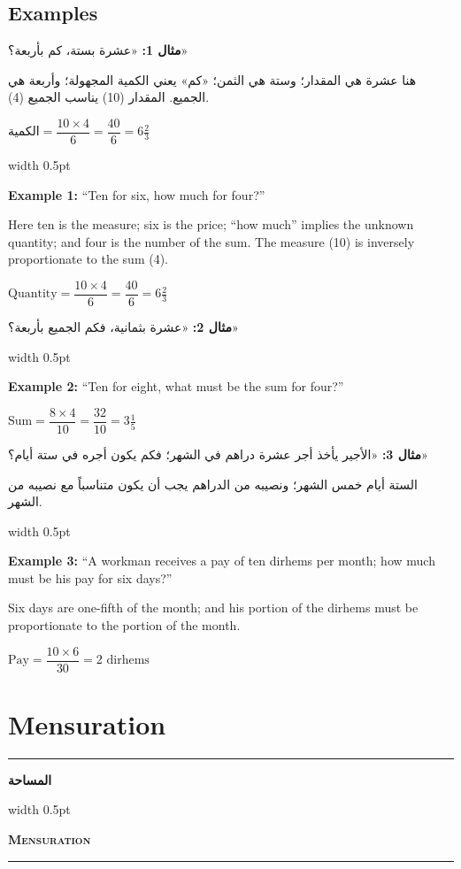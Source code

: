 \documentclass[10pt,a4paper]{book}
\newlength{\colwidth}
\newcommand{\bilingualpair}[2]{%
  \noindent
  \begin{minipage}[t]{\colwidth}
  \begin{flushright}
  \vspace{0pt}
  {\arabicfont\small #1}
  \end{flushright}
  \end{minipage}%
  \hfill\textcolor{columnsepclr}{\vrule width 0.5pt}\hfill
  \begin{minipage}[t]{\colwidth}
  \vspace{0pt}
  {\small #2}
  \end{minipage}%
  \par\vspace{0.6em}
}
\newcommand{\bilingualsectionheader}[2]{%
  \par\vspace{0.8em}
  \noindent
  \begin{minipage}[t]{\colwidth}
  \begin{flushright}
  \textbf{\arabicfont #1}
  \end{flushright}
  \end{minipage}%
  \hfill\textcolor{columnsepclr}{\vrule width 0.5pt}\hfill
  \begin{minipage}[t]{\colwidth}
  \textbf{\textsc{#2}}
  \end{minipage}%
  \par\vspace{0.5em}
}
\begin{document}
\section*{Examples}

\bilingualpair{
\textbf{مثال 1:} «عشرة بستة، كم بأربعة؟»

هنا عشرة هي المقدار؛ وستة هي الثمن؛ «كم» يعني الكمية
المجهولة؛ وأربعة هي الجميع. المقدار (10) يناسب الجميع (4).

$\text{الكمية} = \dfrac{10 \times 4}{6} = \dfrac{40}{6} = 6\tfrac{2}{3}$
}{
\textbf{Example 1:} ``Ten for six, how much for four?''

Here ten is the measure; six is the price; ``how much'' implies the unknown
quantity; and four is the number of the sum. The measure (10) is inversely
proportionate to the sum (4).

$\text{Quantity} = \dfrac{10 \times 4}{6} = \dfrac{40}{6} = 6\tfrac{2}{3}$
}

\bilingualpair{
\textbf{مثال 2:} «عشرة بثمانية، فكم الجميع بأربعة؟»
}{
\textbf{Example 2:} ``Ten for eight, what must be the sum for four?''

$\text{Sum} = \dfrac{8 \times 4}{10} = \dfrac{32}{10} = 3\tfrac{1}{5}$
}

\bilingualpair{
\textbf{مثال 3:} «الأجير يأخذ أجر عشرة دراهم في الشهر؛ فكم يكون
أجره في ستة أيام؟»

الستة أيام خمس الشهر؛ ونصيبه من الدراهم يجب أن يكون
متناسباً مع نصيبه من الشهر.
}{
\textbf{Example 3:} ``A workman receives a pay of ten dirhems per month;
how much must be his pay for six days?''

Six days are one-fifth of the month; and his portion of the dirhems must be
proportionate to the portion of the month.

$\text{Pay} = \dfrac{10 \times 6}{30} = 2 \text{ dirhems}$
}

\newpage

\chapter{Mensuration}
\label{ch:mensuration}

\noindent\textcolor{columnsepclr}{\rule{\textwidth}{0.6pt}}\par\vspace{0.3em}
\bilingualsectionheader{المساحة}{Mensuration}
\noindent\textcolor{columnsepclr}{\rule{\textwidth}{0.6pt}}\par\vspace{0.5em}
\end{document}
